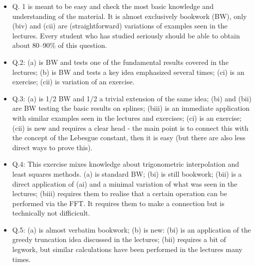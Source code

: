 \documentclass{exams}
\begin{document}
\begin{itemize}
\item Q. 1 is meant to be easy and check the most basic knowledge and
understanding of the material. It is almost exclusively bookwork (BW), only
(biv)  and (cii) are (straightforward) variations of examples seen in the
lectures. Every student who has studied seriously should be able to 
obtain about 80--90\% of this question.
\item Q.2: (a) is BW and tests one of the fundamental results covered in the lectures;
(b) is BW and tests a key idea emphasized several times; (ci) is 
an exercise; (cii) is variation of an exercise.
\item Q.3: (a) is 1/2 BW and 1/2 a trivial extension of the same idea; 
(bi) and (bii) are BW testing the basic results on splines; (biii) is 
an immediate application with similar examples seen in the lectures and 
exercises; (ci)  is an exercise; (cii) is new and requires a clear head - 
the main point is to connect this with the concept of the Lebesgue 
constant, then it is easy (but there are also less direct ways to prove this).
\item Q.4: This exercise mixes knowledge about trigonometric interpolation 
and least squares methods. (a) is standard BW; (bi) is still bookwork; 
(bii) is a direct application of (ai) and a minimal variation of 
what was seen in the lectures; (biii) requires them to realise that a 
certain operation can be performed via the FFT. It requires them to make 
a connection but is technically not difficicult.
\item Q.5: (a) is almost verbatim bookwork; (b) is new: (bi) is an application of 
the greedy truncation idea discussed in the lectures; (bii) 
requires a bit of legwork, but similar calculations have been performed in 
the lectures many times.
\end{itemize}



\end{document}
